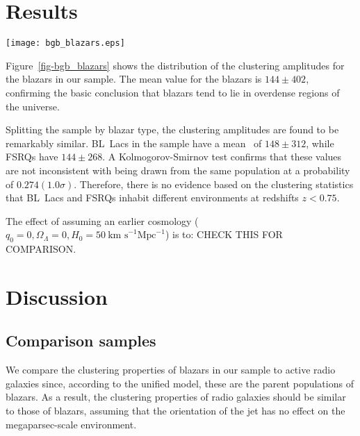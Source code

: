 \documentclass[useAMS,usenatbib]{mn2e}
\begin{document}
\section{Results}\label{sec-survey_results}

\begin{figure*}
\texttt{[image: bgb\_blazars.eps]}
\caption{Top left: Distribution of the \bgb~clustering amplitudes for the entire blazar sample. Top right: Distribution of \bgb~for the BL~Lac and FSRQ sub-populations. Bottom left: \bgb~as a function of the blazar redshift. Bottom right: \bgb~as a function of redshift, color-coded by blazar type. 
\label{fig-bgb_blazars}}
\end{figure*}

Figure~\ref{fig-bgb_blazars} shows the distribution of the clustering amplitudes for the blazars in our sample. The mean value for the blazars is $144\pm402$, confirming the basic conclusion that blazars tend to lie in overdense regions of the universe. 

Splitting the sample by blazar type, the clustering amplitudes are found to be remarkably similar. BL~Lacs in the sample have a mean \bgb~of $148\pm312$, while FSRQs have $144\pm268$. A Kolmogorov-Smirnov test confirms that these values are not inconsistent with being drawn from the same population at a probability of $0.274 (1.0\sigma)$. Therefore, there is no evidence based on the clustering statistics that BL~Lacs and FSRQs inhabit different environments at redshifts $z<0.75$. 

The effect of assuming an earlier cosmology ($q_0=0, \Omega_\Lambda=0, H_0=50~\mbox{km s}^{-1}\mbox{Mpc}^{-1}$) is to: CHECK THIS FOR COMPARISON. 


\section{Discussion}\label{sec-survey_discussion}

\subsection{Comparison samples}\label{ssec-comparison}

We compare the clustering properties of blazars in our sample to active radio galaxies since, according to the unified model, these are the parent populations of blazars. As a result, the clustering properties of radio galaxies should be similar to those of blazars, assuming that the orientation of the jet has no effect on the megaparsec-scale environment. 
\end{document}
